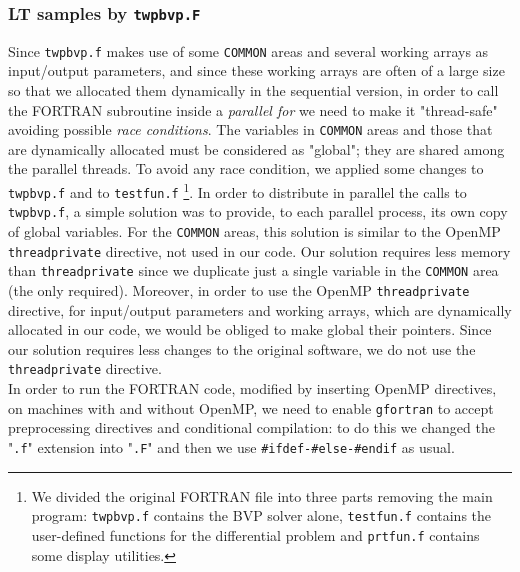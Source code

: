 \documentclass[a4paper,10pt]{report}%
\begin{document}
\subsubsection{LT samples by {\tt twpbvp.F}}
Since {\tt twpbvp.f} makes use of some {\tt COMMON} areas and several working arrays as input/output
parameters, and since these working arrays are often of a large size so that we allocated them dynamically in
the sequential version, in order to call the FORTRAN subroutine inside a {\em parallel for} we need to make it
"thread-safe" avoiding possible {\em race conditions}.
The variables in {\tt COMMON} areas and those that are dynamically allocated must be considered as "global";
they are shared among the parallel threads.
To avoid any race condition, we applied some changes to {\tt twpbvp.f} and to {\tt testfun.f}
\footnote{ We divided the original FORTRAN file into three parts removing the main program: {\tt twpbvp.f}
contains the BVP solver alone, {\tt testfun.f} contains the user-defined functions for the differential problem
and {\tt prtfun.f} contains some display utilities.}.
In order to distribute in parallel the calls to {\tt twpbvp.f}, a simple solution was to provide, to each
parallel process, its own copy of global variables. For the {\tt COMMON} areas, this solution is similar to
the OpenMP {\tt threadprivate} directive, not used in our code. Our solution requires less memory than
{\tt threadprivate} since we duplicate just a single variable in the {\tt COMMON} area (the only required).
Moreover, in order to use the OpenMP {\tt threadprivate} directive, for input/output parameters and working
arrays, which are dynamically allocated in our code, we would be obliged to make global their pointers.
Since our solution requires less changes to the original software, we do not use the {\tt threadprivate}
directive.
\\
In order to run the FORTRAN code, modified by inserting OpenMP directives, on machines with and without OpenMP, 
we need to enable {\tt gfortran} to accept preprocessing directives and conditional compilation: to do this
we changed the "{\tt .f}" extension into "{\tt .F}" and then we use {\small\tt \#ifdef-\#else-\#endif} as usual.
\end{document}
